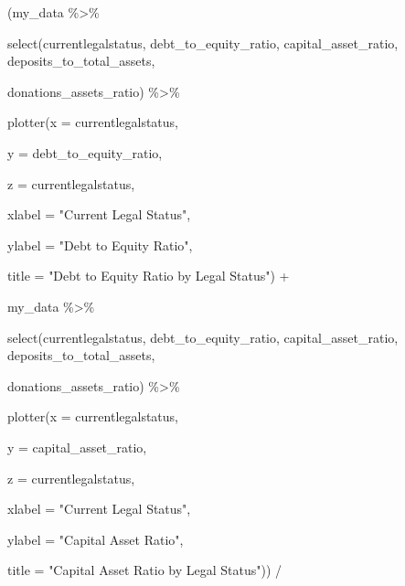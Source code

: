 \documentclass[a4paper,nobind]{templates/ociamthesis}
\newenvironment{Shaded}{\begin{snugshade}}{\end{snugshade}}
\newcommand{\AttributeTok}[1]{\textcolor[rgb]{0.77,0.63,0.00}{#1}}
\newcommand{\FunctionTok}[1]{\textcolor[rgb]{0.00,0.00,0.00}{#1}}
\newcommand{\NormalTok}[1]{#1}
\newcommand{\SpecialCharTok}[1]{\textcolor[rgb]{0.00,0.00,0.00}{#1}}
\newcommand{\StringTok}[1]{\textcolor[rgb]{0.31,0.60,0.02}{#1}}
\renewenvironment{Shaded}
{
  \vspace{10pt}%
  \begin{snugshade}%
}{%
  \end{snugshade}%
  \vspace{8pt}%
}
\begin{document}
\begin{landscape}

\begin{Shaded}
\begin{Highlighting}[]
\NormalTok{(my\_data }\SpecialCharTok{\%\textgreater{}\%} 
  
  \FunctionTok{select}\NormalTok{(currentlegalstatus, debt\_to\_equity\_ratio, capital\_asset\_ratio, deposits\_to\_total\_assets, }
         
\NormalTok{         donations\_assets\_ratio) }\SpecialCharTok{\%\textgreater{}\%} 
  
  \FunctionTok{plotter}\NormalTok{(}\AttributeTok{x =}\NormalTok{ currentlegalstatus, }
          
          \AttributeTok{y =}\NormalTok{ debt\_to\_equity\_ratio, }
          
          \AttributeTok{z =}\NormalTok{ currentlegalstatus, }
          
          \AttributeTok{xlabel =} \StringTok{"Current Legal Status"}\NormalTok{, }
          
          \AttributeTok{ylabel =} \StringTok{"Debt to Equity Ratio"}\NormalTok{, }
          
          \AttributeTok{title =} \StringTok{"Debt to Equity Ratio by Legal Status"}\NormalTok{) }\SpecialCharTok{+}


\NormalTok{my\_data }\SpecialCharTok{\%\textgreater{}\%} 
  
  \FunctionTok{select}\NormalTok{(currentlegalstatus, debt\_to\_equity\_ratio, capital\_asset\_ratio, deposits\_to\_total\_assets, }
         
\NormalTok{         donations\_assets\_ratio) }\SpecialCharTok{\%\textgreater{}\%} 
  
  \FunctionTok{plotter}\NormalTok{(}\AttributeTok{x =}\NormalTok{ currentlegalstatus, }
          
          \AttributeTok{y =}\NormalTok{ capital\_asset\_ratio, }
          
          \AttributeTok{z =}\NormalTok{ currentlegalstatus, }
          
          \AttributeTok{xlabel =} \StringTok{"Current Legal Status"}\NormalTok{, }
          
          \AttributeTok{ylabel =} \StringTok{"Capital Asset Ratio"}\NormalTok{, }
          
          \AttributeTok{title =} \StringTok{"Capital Asset Ratio by Legal Status"}\NormalTok{)) }\SpecialCharTok{/}


\end{Highlighting}
\end{Shaded}
\end{landscape}
\end{document}

